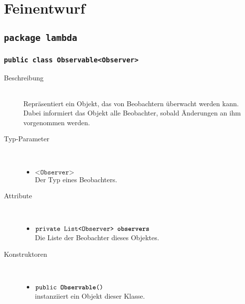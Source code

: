 \section{Feinentwurf}

\subsection{\texttt{package lambda}}

\subsubsection{\normalfont \texttt{public class \textbf{Observable}<Observer>}}

\begin{description}
\item[Beschreibung] \hfill \\ Repräsentiert ein Objekt, das von Beobachtern überwacht werden kann. Dabei informiert das Objekt alle Beobachter, sobald Änderungen an ihm vorgenommen werden.

\item[Typ-Parameter] \hfill \\
	\vspace{-.8cm}
	\begin{itemize}
		\item $\texttt{<Observer>}$ \\ Der Typ eines Beobachters.
	\end{itemize}

\item[Attribute] \hfill \\
	\vspace{-.8cm}
	\begin{itemize}
		\item $\texttt{private List<Observer> \textbf{observers}}$ \\ Die Liste der Beobachter dieses Objektes.
	\end{itemize}
	
\item[Konstruktoren] \hfill \\
	\vspace{-.8cm}
	\begin{itemize}
		\item $\texttt{public \textbf{Observable}()}$ \\ instanziiert ein Objekt dieser Klasse.
	\end{itemize}
	

\end{description}
